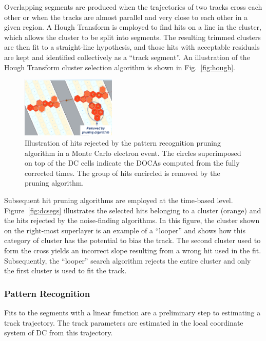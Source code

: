 Overlapping segments are produced when the trajectories of two tracks cross each other or when the tracks are
almost parallel and very close to each other in a given region. A Hough Transform is employed to find hits on a line
in the cluster, which allows the cluster to be split into segments.  The resulting trimmed clusters are then fit to a
straight-line hypothesis, and those hits with acceptable residuals are kept and identified collectively as a
``track segment''. An illustration of the Hough Transform cluster selection algorithm is shown in Fig.~\ref{fig:hough}.

\begin{figure}[t]
\centering
\includegraphics[width=0.4\textwidth]{pics/dcPattern2.png}
\caption{Illustration of hits rejected by the pattern recognition pruning algorithm in a Monte Carlo electron
  event. The circles superimposed on top of the DC cells indicate the DOCAs computed from the fully corrected
  times. The group of hits encircled is removed by the pruning algorithm.}
\label{fig:strings}
\end{figure}

Subsequent hit pruning algorithms are employed at the time-based level. Figure~\ref{fig:dcsegs} illustrates the
selected hits belonging to a cluster (orange) and the hits rejected by the noise-finding algorithms.
In this figure, the cluster shown
  on the right-most superlayer is an example of a ``looper'' and shows how this category of cluster has the potential
  to bias the track. The second cluster used to form the cross yields an incorrect slope resulting from a wrong hit
  used in the fit.  Subsequently, the ``looper'' search algorithm rejects the entire cluster and only the first cluster
  is used to fit the track. 
  
\subsubsection{Pattern Recognition}

Fits to the segments with a linear function are a preliminary step to estimating a track trajectory. The track
parameters are estimated in the local coordinate system of DC from this trajectory.

